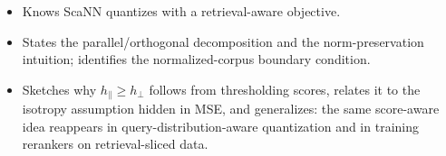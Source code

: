 \begin{interviewq}

\goodgreat
\begin{itemize}
    \item {} Knows ScaNN quantizes with a retrieval-aware objective.
    \item {} States the parallel/orthogonal decomposition and the norm-preservation intuition; identifies the normalized-corpus boundary condition.
    \item {} Sketches why $h_{\parallel} \ge h_{\perp}$ follows from thresholding scores, relates it to the isotropy assumption hidden in MSE, and generalizes: the same score-aware idea reappears in query-distribution-aware quantization and in training rerankers on retrieval-sliced data.
\end{itemize}

\end{interviewq}


